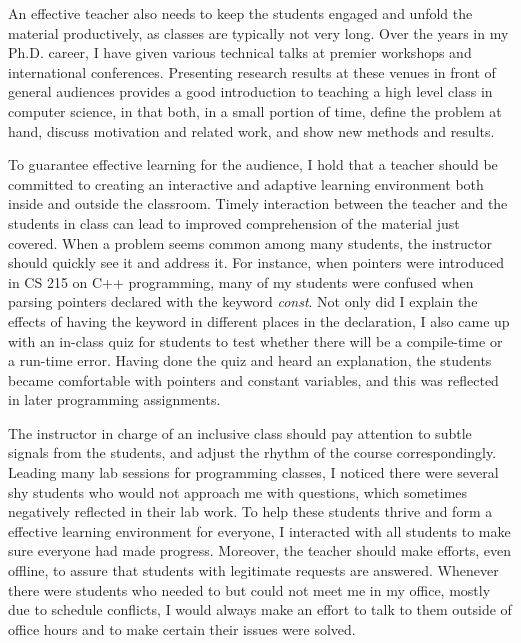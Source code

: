 \documentclass[12pt]{article}
\newcommand{\tit}[1]{\textit{#1}}
\begin{document}
An effective teacher also needs to keep the students engaged
and unfold the material productively, as classes are typically not very long.
Over the years in my Ph.D. career, I have given various technical
talks at premier workshops and international conferences.
Presenting research results at these venues in front of general audiences
provides a good introduction to teaching a high level class in computer science,
in that both, in a small portion of time, define the problem at hand, discuss motivation and related work,
and show new methods and results.

To guarantee effective learning for the audience, 
I hold that a teacher should be committed to
creating an interactive and adaptive learning environment both inside
and outside the classroom.
Timely interaction between the teacher and the students in class can lead to improved
comprehension of the material just covered.
When a problem seems common among many students, the instructor should quickly
see it and address it.
For instance, when pointers were introduced in CS 215 on C++ programming, 
many of my students were confused when parsing pointers declared with the keyword \tit{const}.
Not only did I explain the effects of having the keyword in different places in the
declaration, I also came up with an in-class quiz for students to test whether there
will be a compile-time or a run-time error.
Having done the quiz and heard an explanation, the students became comfortable with
pointers and constant variables, and this was reflected in later programming assignments.

The instructor in charge of an inclusive class should
pay attention to subtle signals from the students, 
and adjust the rhythm of the course correspondingly.
Leading many lab sessions for programming classes,
I noticed there were several shy students who would not approach me with questions,
which sometimes negatively reflected in their lab work.
To help these students thrive and form a effective learning environment for everyone, 
I interacted with all students to make sure everyone had made progress.
Moreover, the teacher should make efforts, even offline, 
to assure that students with legitimate requests are answered.
Whenever there were students who needed to but could not
meet me in my office, mostly due to schedule conflicts, 
I would always make an effort to talk to them outside of office hours and
to make certain their issues were solved.
\end{document}

